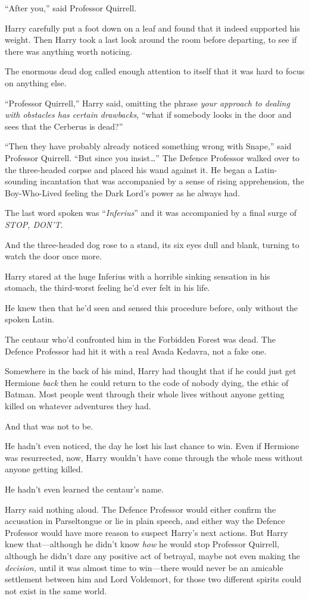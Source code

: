 “After you,” said Professor Quirrell.

Harry carefully put a foot down on a leaf and found that it indeed supported
his weight. Then Harry took a last look around the room before departing, to
see if there was anything worth noticing.

The enormous dead dog called enough attention to itself that it was hard to
focus on anything else.

“Professor Quirrell,” Harry said, omitting the phrase \emph{your approach to
dealing with obstacles has certain drawbacks,} “what if somebody looks in the
door and sees that the Cerberus is dead?”

“Then they have probably already noticed something wrong with Snape,” said
Professor Quirrell. “But since you insist…” The Defence Professor walked
over to the three-headed corpse and placed his wand against it. He began a
Latin-sounding incantation that was accompanied by a sense of rising
apprehension, the Boy-Who-Lived feeling the Dark Lord’s power as he always had.

The last word spoken was “\emph{Inferius}” and it was accompanied by a final
surge of \emph{STOP, DON’T}.

And the three-headed dog rose to a stand, its six eyes dull and blank, turning
to watch the door once more.

Harry stared at the huge Inferius with a horrible sinking sensation in his
stomach, the third-worst feeling he’d ever felt in his life.

He knew then that he’d seen and sensed this procedure before, only without the
spoken Latin.

The centaur who’d confronted him in the Forbidden Forest was dead. The Defence
Professor had hit it with a real Avada Kedavra, not a fake one.

Somewhere in the back of his mind, Harry had thought that if he could just get
Hermione \emph{back} then he could return to the code of nobody dying, the
ethic of Batman. Most people went through their whole lives without anyone
getting killed on whatever adventures they had.

And that was not to be.

He hadn’t even noticed, the day he lost his last chance to win. Even if
Hermione was resurrected, now, Harry wouldn’t have come through the whole mess
without anyone getting killed.

He hadn’t even learned the centaur’s name.

Harry said nothing aloud. The Defence Professor would either confirm the
accusation in Parseltongue or lie in plain speech, and either way the Defence
Professor would have more reason to suspect Harry’s next actions. But Harry
knew that—although he didn’t know \emph{how} he would stop Professor
Quirrell, although he didn’t dare any positive act of betrayal, maybe not even
making the \emph{decision,} until it was almost time to win—there would never
be an amicable settlement between him and Lord Voldemort, for those two
different spirits could not exist in the same world.

